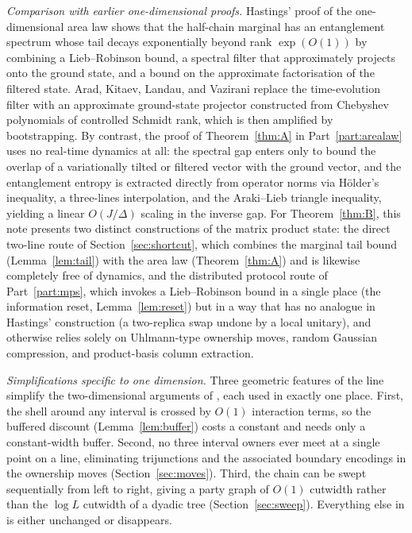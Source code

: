 \begin{inwords}
\emph{Comparison with earlier one-dimensional proofs.} Hastings' proof of the
one-dimensional area law \cite{Hastings2007} shows that the half-chain
marginal has an entanglement spectrum whose tail decays exponentially beyond
rank $\exp(O(1))$ by combining a Lieb--Robinson bound, a spectral filter
that approximately projects onto the ground state, and a bound on the
approximate factorisation of the filtered state. Arad, Kitaev, Landau, and Vazirani
\cite{AKLV} replace the time-evolution filter with an approximate
ground-state projector constructed from Chebyshev polynomials of controlled
Schmidt rank, which is then amplified by bootstrapping. By contrast, the
proof of Theorem~\ref{thm:A} in Part~\ref{part:arealaw} uses no real-time
dynamics at all: the spectral gap enters only to bound the overlap of a
variationally tilted or filtered vector with the ground vector, and the entanglement
entropy is extracted directly from operator norms via Hölder's inequality, a
three-lines interpolation, and the Araki--Lieb triangle
inequality, yielding a linear $O(J/\Delta)$ scaling in the inverse gap. For
Theorem~\ref{thm:B}, this note presents two distinct constructions of the
matrix product state: the direct two-line route of Section~\ref{sec:shortcut},
which combines the marginal tail bound (Lemma~\ref{lem:tail}) with the area
law (Theorem~\ref{thm:A}) and is likewise completely free of dynamics, and
the distributed protocol route of Part~\ref{part:mps}, which invokes a
Lieb--Robinson bound in a single place (the information reset,
Lemma~\ref{lem:reset}) but in a way that has no analogue in Hastings'
construction (a two-replica swap undone by a local unitary), and otherwise
relies solely on Uhlmann-type ownership moves, random Gaussian compression,
and product-basis column extraction.

\emph{Simplifications specific to one dimension.} Three geometric features of
the line simplify the two-dimensional arguments of \cite{AL,PP}, each used in
exactly one place. First, the shell around any interval is crossed by $O(1)$
interaction terms, so the buffered discount (Lemma~\ref{lem:buffer}) costs
a constant and needs only a constant-width buffer. Second, no three interval owners ever meet at a single point on
a line, eliminating trijunctions and the associated boundary encodings in the
ownership moves (Section~\ref{sec:moves}). Third, the chain can be swept
sequentially from left to right, giving a party graph of $O(1)$ cutwidth
rather than the $\log L$ cutwidth of a dyadic tree (Section~\ref{sec:sweep}).
Everything else in \cite{AL,PP} is either unchanged or disappears.


\end{inwords}
